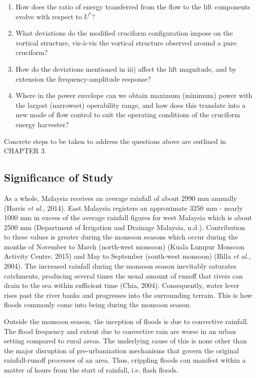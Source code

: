 \documentclass[]{article}
\begin{document}
\begin{enumerate}
\def\labelenumi{\roman{enumi})}
\item
  How does the ratio of energy transferred from the flow to the lift
  components evolve with respect to \(U^{*}\)?
\item
  What deviations do the modified cruciform configuration impose on the
  vortical structure, vis-à-vis the vortical structure observed around a
  pure cruciform?
\item
  How do the deviations mentioned in iii) affect the lift magnitude, and
  by extension the frequency-amplitude response?
\item
  Where in the power envelope can we obtain maximum (minimum) power with
  the largest (narrowest) operability range, and how does this translate
  into a new mode of flow control to suit the operating conditions of
  the cruciform energy harvester?
\end{enumerate}

Concrete steps to be taken to address the questions above are outlined
in CHAPTER 3.

\hypertarget{significance-of-study}{\subsection{Significance of
Study}\label{significance-of-study}}

\protect\hypertarget{_Hlk21508814}{}{}As a whole, Malaysia receives an
average rainfall of about 2990 mm annually (Harris \emph{et al.}, 2014).
East Malaysia registers an approximate 3250 mm - nearly 1000 mm in
excess of the average rainfall figures for west Malaysia which is about
2500 mm (Department of Irrigation and Drainage Malaysia, n.d.).
Contribution to these values is greater during the monsoon seasons which
occur during the months of November to March (north-west monsoon) (Kuala
Lumpur Monsoon Activity Centre, 2015) and May to September (south-west
monsoon) (Billa \emph{et al.}, 2004). The increased rainfall during the
monsoon season inevitably saturates catchments, producing several times
the usual amount of runoff that rivers can drain to the sea within
sufficient time (Chia, 2004). Consequently, water lever rises past the
river banks and progresses into the surrounding terrain. This is how
floods commonly come into being during the monsoon season.

Outside the monsoon season, the inception of floods is due to convective
rainfall. The flood frequency and extent due to convective rain are
worse in an urban setting compared to rural areas. The underlying cause
of this is none other than the major disruption of pre-urbanization
mechanisms that govern the original rainfall-runoff processes of an
area. Thus, crippling floods can manifest within a matter of hours from
the start of rainfall, i.e. flash floods.
\end{document}
